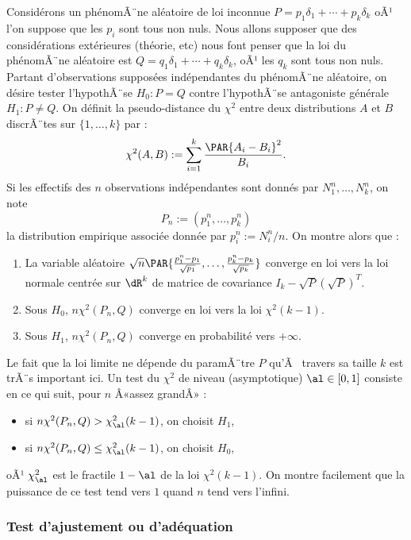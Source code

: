 Considérons un phénomÃ¨ne aléatoire de loi inconnue $P=p_1\delta_1+\cdots+p_k\delta_k$ oÃ¹
l'on suppose que les $p_i$ sont tous non nuls. Nous allons supposer que des
considérations extérieures (théorie, etc) nous font penser que la loi du
phénomÃ¨ne aléatoire est $Q=q_1\delta_1+\cdots+q_k\delta_k$, oÃ¹ les $q_k$ sont tous non
nuls. Partant d'observations supposées indépendantes du phénomÃ¨ne aléatoire,
on désire tester l'hypothÃ¨se $H_0 : P=Q$ contre l'hypothÃ¨se antagoniste
générale $H_1: P\neq Q$. On définit la pseudo-distance du $\chi^2$ entre deux
distributions $A$ et $B$ discrÃ¨tes sur $\{1,\ldots,k\}$ par :
$$
\chi^2(A,B):=\sum_{i=1}^k \frac{\PAR{A_i-B_i}^2}{B_i}.
$$
Si les effectifs des $n$ observations indépendantes sont donnés par
$N_1^n,\ldots,N_k^n$, on note 
$$
P_n:=(p^n_1,\ldots,p^n_k)
$$ 
la distribution empirique associée donnée par $p^n_i:=N_i^n/n$. 
On montre alors que :
\begin{enumerate}
\item La variable aléatoire $\sqrt{n}
  \PAR{\frac{p_1^n-p_1}{\sqrt{p_1}},\ldots,\frac{p_k^n-p_k}{\sqrt{p_k}}}$
  converge en loi vers la loi normale centrée sur $\dR^k$ de matrice de
  covariance $I_k-\sqrt{P}(\sqrt{P})^T$.
\item Sous $H_0$, $n\chi^2(P_n,Q)$ converge en loi vers la loi $\chi^2(k-1)$.
\item Sous $H_1$, $n\chi^2(P_n,Q)$ converge en probabilité vers $+\infty$.
\end{enumerate}
Le fait que la loi limite ne dépende du paramÃ¨tre $P$ qu'Ã  travers sa taille
$k$ est trÃ¨s important ici.  Un test du $\chi^2$ de niveau (asymptotique)
$\al\in[0,1]$ consiste en ce qui suit, pour $n$ Â«assez grandÂ» :
\begin{itemize}
\item si $n\chi^2(P_n,Q)>\chi_\al^2(k-1)$, on choisit $H_1$,
\item si $n\chi^2(P_n,Q)\leq\chi_\al^2(k-1)$, on choisit $H_0$,
\end{itemize}
oÃ¹ $\chi^2_\al$ est le fractile $1-\al$ de la loi $\chi^2(k-1)$.
On montre facilement que la puissance de ce test tend vers $1$ quand $n$ tend
vers l'infini.

\subsubsection{Test d'ajustement ou d'adéquation}

